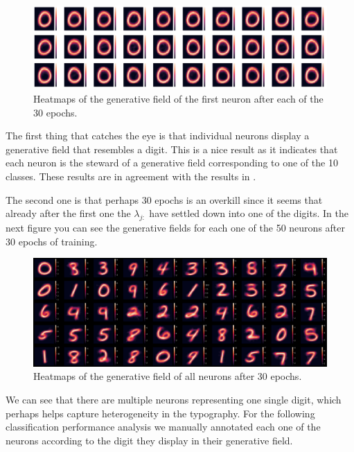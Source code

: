 \documentclass{article}
\begin{document}
\begin{figure}[h]
   \includegraphics[width=\textwidth]{img/output_41_1.png}
   \caption{Heatmaps of the generative field of the first neuron after each of the 30 epochs. \label{gen_filed_evo}}
\end{figure}
 
The first thing that catches the eye is that individual neurons display a generative field that resembles a digit. This is a nice result as it indicates that each neuron is the steward of a generative field corresponding to one of the 10 classes. These results are in agreement with the results in \cite{Keck2012}.
 
The second one is that perhaps 30 epochs is an overkill since it seems that already after the first one the \(\lambda_{j:}\) have settled down into one of the digits. In the next figure you can see the generative fields for each one of the 50 neurons after 30 epochs of training.
 
\begin{figure}[h]
   \includegraphics[width=\textwidth]{img/output_43_1.png}
   \caption{Heatmaps of the generative field of all neurons after 30 epochs. \label{gen_fileds}}
\end{figure}
 
We can see that there are multiple neurons representing one single digit, which perhaps helps capture heterogeneity in the typography. For the following classification performance analysis we manually annotated each one of the neurons according to the digit they display in their generative field.
 
\end{document}
